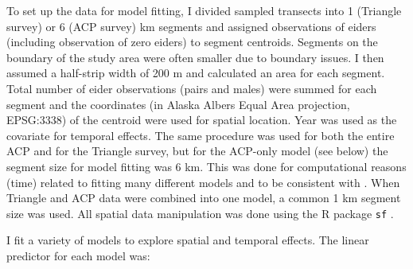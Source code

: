 \documentclass[
  10pt,
  letterpaper,
]{article}
\begin{document}
To set up the data for model fitting, I divided sampled transects into 1
(Triangle survey) or 6 (ACP survey) km segments and assigned
observations of eiders (including observation of zero eiders) to segment
centroids. Segments on the boundary of the study area were often smaller
due to boundary issues. I then assumed a half-strip width of 200 m and
calculated an area for each segment. Total number of eider observations
(pairs and males) were summed for each segment and the coordinates (in Alaska Albers Equal Area projection, EPSG:3338) of the centroid were used for spatial location. Year was used as the covariate for temporal effects. The same procedure was used for both the entire ACP and for the Triangle survey, but for the ACP-only model (see below) the segment size for model fitting was 6 km. This was done for computational reasons (time) related to fitting many different models and to be consistent with \citep{amundson2019}. When Triangle and ACP data were combined into one model, a common 1 km segment size was used. All spatial data manipulation was done using the R package \texttt{sf} \citep{sf}.

I fit a variety of models to explore spatial and temporal effects. The
linear predictor for each model was:
\end{document}
